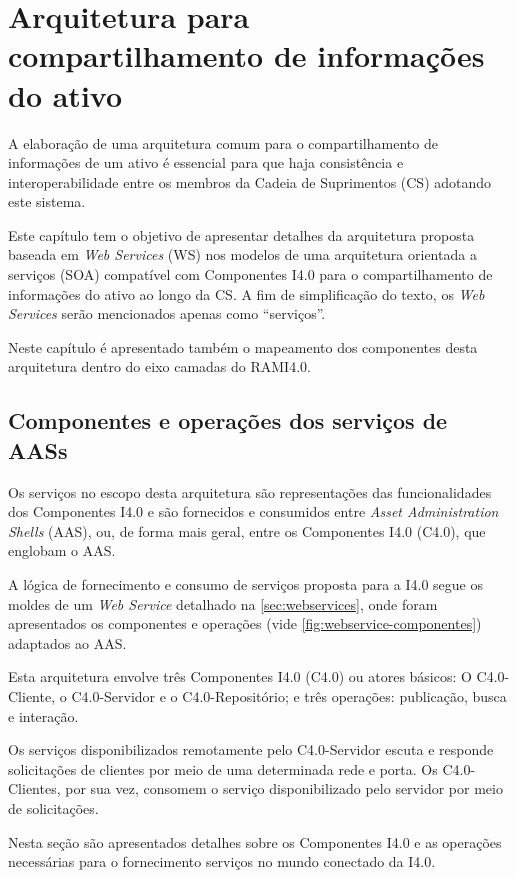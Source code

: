 \chapter{Arquitetura para compartilhamento de informações do ativo}
\label{cha:arquitetura}

A elaboração de uma arquitetura comum para o compartilhamento de informações de um ativo é essencial para que haja consistência e interoperabilidade entre os membros da Cadeia de Suprimentos (CS) adotando este sistema.

Este capítulo tem o objetivo de apresentar detalhes da arquitetura proposta baseada em \textit{Web Services} (WS) nos modelos de uma arquitetura orientada a serviços (SOA) compatível com Componentes I4.0 para o compartilhamento de informações do ativo ao longo da CS. A fim de simplificação do texto, os \textit{Web Services} serão mencionados apenas como ``serviços''.

Neste capítulo é apresentado também o mapeamento dos componentes desta arquitetura dentro do eixo camadas do RAMI4.0.

\section{Componentes e operações dos serviços de AASs}

Os serviços no escopo desta arquitetura são representações das funcionalidades dos Componentes I4.0 e são fornecidos e consumidos entre \textit{Asset Administration Shells} (AAS), ou, de forma mais geral, entre os Componentes I4.0 (C4.0), que englobam o AAS.

A lógica de fornecimento e consumo de serviços proposta para a I4.0 segue os moldes de um \textit{Web Service} detalhado na \autoref{sec:webservices}, onde foram apresentados os componentes e operações (vide \autoref{fig:webservice-componentes}) adaptados ao AAS.

Esta arquitetura envolve três Componentes I4.0 (C4.0) ou atores básicos: O C4.0-Cliente, o C4.0-Servidor e o C4.0-Repositório; e três operações: publicação, busca e interação.

Os serviços disponibilizados remotamente pelo C4.0-Servidor escuta e responde solicitações de clientes por meio de uma determinada rede e porta. Os C4.0-Clientes, por sua vez, consomem o serviço disponibilizado pelo servidor por meio de solicitações.

Nesta seção são apresentados detalhes sobre os Componentes I4.0 e as operações necessárias para o fornecimento serviços no mundo conectado da I4.0.

